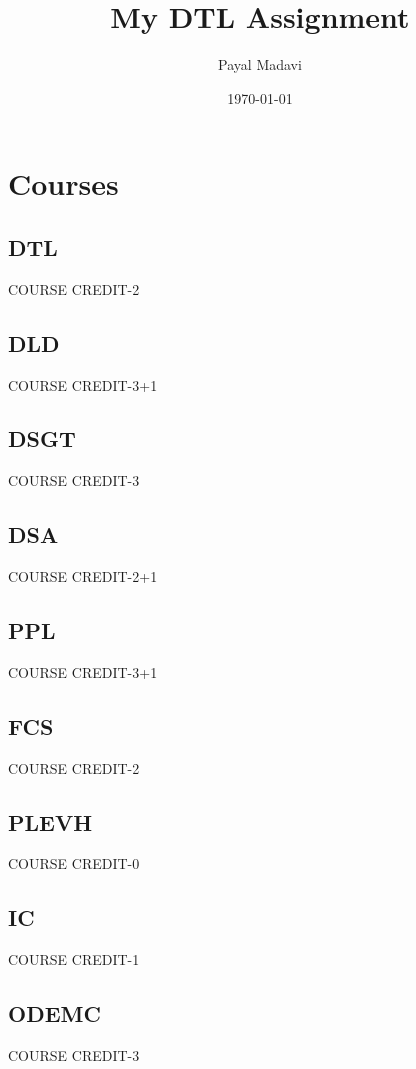 \documentclass[12pt]{article}
\title{My DTL Assignment}
\author{Payal Madavi}
\date{\today}
\begin{document}
\maketitle
{}
\newpage
{}
\section{Courses}
\subsection{DTL}
COURSE CREDIT-2
\subsection{DLD}
COURSE CREDIT-3+1
\subsection{DSGT}
COURSE CREDIT-3
\subsection{DSA}
COURSE CREDIT-2+1
\subsection{PPL}
COURSE CREDIT-3+1
\subsection{FCS}
COURSE CREDIT-2
\subsection{PLEVH}
COURSE CREDIT-0
\subsection{IC}
COURSE CREDIT-1
\subsection{ODEMC}
COURSE CREDIT-3
\end{document}
